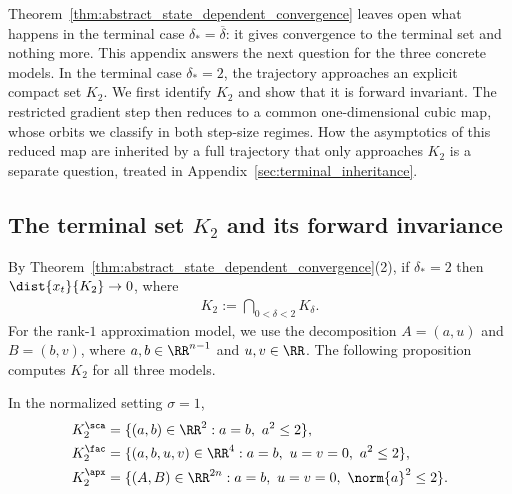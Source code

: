 \documentclass{article}
\begin{document}
Theorem~\ref{thm:abstract_state_dependent_convergence} leaves open what happens
in the terminal case $\delta_\ast=\overline\delta$: it gives convergence to
the terminal set and nothing more. This appendix answers the next question for
the three concrete models. In the terminal case $\delta_\ast=2$, the trajectory
approaches an explicit compact set $K_2$. We first identify $K_2$ and show that
it is forward invariant. The restricted gradient step then reduces to a common
one-dimensional cubic map, whose orbits we classify in both step-size
regimes. How the asymptotics of this reduced map are inherited by a full
trajectory that only approaches $K_2$ is a separate question, treated in
Appendix~\ref{sec:terminal_inheritance}.

\subsection{The terminal set \texorpdfstring{$K_2$}{K2} and its forward invariance}
\label{appx:K_2_description}

By Theorem~\ref{thm:abstract_state_dependent_convergence}(2), if
$\delta_\ast=2$ then $\dist{x_t}{K_2}\to0$, where
\begin{align}
    K_2 := \bigcap_{0<\delta<2} K_\delta.
\end{align}
For the rank-$1$ approximation model, we use the decomposition
$A=(a,u)$ and $B=(b,v)$, where $a,b\in\RR^{n-1}$ and $u,v\in\RR$.
The following proposition computes $K_2$ for all three models.

\begin{proposition}
\label{prop:terminal_sets}
In the normalized setting $\sigma=1$,
\begin{align}
    K_2^\sca &= \{(a,b)\in\RR^2 : a=b,\ a^2\le 2\},\\
    K_2^\fac &= \{(a,b,u,v)\in\RR^4 : a=b,\ u=v=0,\ a^2\le 2\},\\
    K_2^\apx &= \{(A,B)\in\RR^{2n} : a=b,\ u=v=0,\ \norm{a}^2\le 2\}.
\end{align}
\end{proposition}
\end{document}
